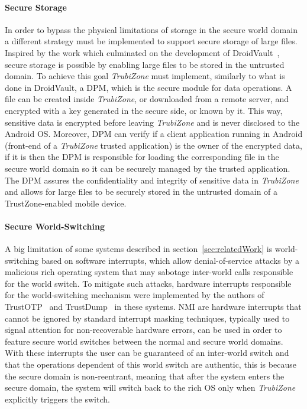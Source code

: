 \paragraph{\textbf{Secure Storage}}

In order to bypass the physical limitations of storage in the secure world domain a different strategy must be implemented to support secure storage of large files. Inspired by the work which culminated on the development of DroidVault~\cite{li2014droidvault}, secure storage is possible by enabling large files to be stored in the untrusted domain. To achieve this goal \emph{TrubiZone} must implement, similarly to what is done in DroidVault, a \ac{DPM}, which is the secure module for data operations. A file can be created inside \emph{TrubiZone}, or downloaded from a remote server, and encrypted with a key generated in the secure side, or known by it. This way, sensitive data is encrypted before leaving \emph{TrubiZone} and is never disclosed to the Android OS. Moreover, \ac{DPM} can verify if a client application running in Android (front-end of a \emph{TrubiZone} trusted application) is the owner of the encrypted data, if it is then the \ac{DPM} is responsible for loading the corresponding file in the secure world domain so it can be securely managed by the trusted application. The \ac{DPM} assures the confidentiality and integrity of sensitive data in \emph{TrubiZone} and allows for large files to be securely stored in the untrusted domain of a TrustZone-enabled mobile device.

\paragraph{\textbf{Secure World-Switching}}

A big limitation of some systems described in section~\ref{sec:relatedWork} is world-switching based on software interrupts, which allow denial-of-service attacks by a malicious rich operating system that may sabotage inter-world calls responsible for the world switch. To mitigate such attacks, hardware interrupts responsible for the world-switching mechanism were implemented by the authors of TrustOTP~\cite{sun2015trustotp} and TrustDump~\cite{sun2015reliable} in these systems. \ac{NMI} are hardware interrupts that cannot be ignored by standard interrupt masking techniques, typically used to signal attention for non-recoverable hardware errors, can be used in order to feature secure world switches between the normal and secure world domains. With these interrupts the user can be guaranteed of an inter-world switch and that the operations dependent of this world switch are authentic, this is because the secure domain is non-reentrant, meaning that after the system enters the secure domain, the system will switch back to the rich OS only when \emph{TrubiZone} explicitly triggers the switch.

